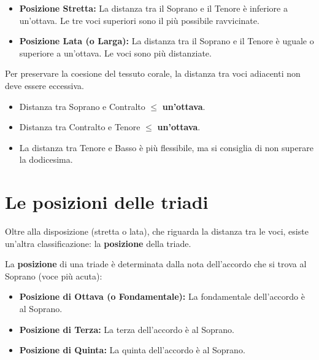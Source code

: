 \begin{definizione}
	\label{def:posizione_stretta_lata}
	\begin{itemize}
		\item \textbf{Posizione Stretta:} La distanza tra il Soprano e il Tenore è inferiore a un'ottava. Le tre voci superiori sono il più possibile ravvicinate.
		\item \textbf{Posizione Lata (o Larga):} La distanza tra il Soprano e il Tenore è uguale o superiore a un'ottava. Le voci sono più distanziate.
	\end{itemize}
\end{definizione}

\begin{regola}
	\label{reg:distanza_voci}
	Per preservare la coesione del tessuto corale, la distanza tra voci adiacenti non deve essere eccessiva.
	\begin{itemize}
		\item Distanza tra Soprano e Contralto $\le$ \textbf{un'ottava}.
		\item Distanza tra Contralto e Tenore $\le$ \textbf{un'ottava}.
		\item La distanza tra Tenore e Basso è più flessibile, ma si consiglia di non superare la dodicesima.
	\end{itemize}
\end{regola}

\section{Le posizioni delle triadi}
\label{sec:posizioni_triadi}

Oltre alla disposizione (stretta o lata), che riguarda la distanza tra le voci, esiste un'altra classificazione: la \textbf{posizione} della triade.

\begin{definizione}
	\label{def:posizione_triade}
	La \textbf{posizione} di una triade è determinata dalla nota dell'accordo che si trova al Soprano (voce più acuta):
	\begin{itemize}
		\item \textbf{Posizione di Ottava (o Fondamentale):} La fondamentale dell'accordo è al Soprano.
		\item \textbf{Posizione di Terza:} La terza dell'accordo è al Soprano.
		\item \textbf{Posizione di Quinta:} La quinta dell'accordo è al Soprano.
	\end{itemize}
\end{definizione}

